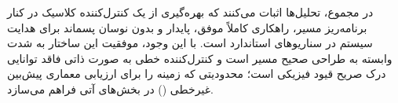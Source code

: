 در مجموع، تحلیل‌ها اثبات می‌کنند که بهره‌گیری از یک کنترل‌کننده کلاسیک در کنار برنامه‌ریز مسیر، راهکاری کاملاً موفق، پایدار و بدون نوسان پسماند برای هدایت سیستم در سناریوهای استاندارد است. با این وجود، موفقیت این ساختار به شدت وابسته به طراحی صحیح مسیر است و کنترل‌کننده خطی به صورت ذاتی فاقد توانایی درک صریح قیود فیزیکی است؛ محدودیتی که زمینه را برای ارزیابی معماری پیش‌بین غیرخطی () در بخش‌های آتی فراهم می‌سازد.